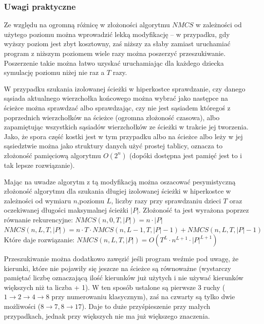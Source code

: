 \documentclass{pracamgr}
\begin{document}
    \subsubsection{Uwagi praktyczne}
     Ze względu na ogromną różnicę w złożoności algorytmu $NMCS$ w zależności od użytego poziomu można wprowadzić lekką modyfikację -- w przypadku,
     gdy wyższy poziom jest zbyt kosztowny, zaś niższy za słaby zamiast uruchamiać program z niższym poziomem wiele razy można poszerzyć przeszukiwanie.
     Poszerzenie takie można łatwo uzyskać uruchamiając dla każdego dziecka symulację poziomu niżej nie raz a $T$ razy.
     
     W przypadku szukania izolowanej ścieżki w hiperkostce sprawdzanie, czy danego sąsiada aktualnego wierzchołka końcowego można wybrać
     jako następce na ścieżce można sprawdzać albo sprawdzając, czy nie jest sąsiadem któregoś z poprzednich wierzchołków na ścieżce (ogromna złożoność czasowa),
     albo zapamiętując wszystkich sąsiadów wierzchołków ze ścieżki w trakcie jej tworzenia. Jako, że spora część kostki jest w tym przypadku albo na ścieżce
     albo leży w jej sąsiedztwie można jako struktury danych użyć prostej tablicy, oznacza to złożoność pamięciową algorytmu $O(2^n)$
     (dopóki dostępna jest pamięć jest to i tak lepsze rozwiązanie).
     
     Mając na uwadze algorytm z tą modyfikacją można oszacować pesymistyczną złożoność algorytmu dla szukania długiej izolowanej ścieżki w hiperkostce
     w zależności od wymiaru $n$,poziomu $L$, liczby razy przy sprawdzaniu dzieci $T$ oraz oczekiwanej długości maksymalnej ścieżki $|P|$.
     Złożoność ta jest wyrażona poprzez równanie rekurencyjne:\newline
     $NMCS(n,0,T,|P|)=n\cdot |P|$\newline
     $NMCS(n,L,T,|P|)=n\cdot T\cdot NMCS(n,L-1,T,|P|-1)+NMCS(n,L,T,|P|-1)$\newline
     Które daje rozwiązanie:\newline
     $NMCS(n,L,T,|P|)=O(T^L\cdot n^{L+1}\cdot|P|^{L+1})$
     
     Przeszukiwanie można dodatkowo zawęzić jeśli program weźmie pod uwagę, że kierunki, które nie pojawiły się jeszcze na ścieżce są równoważne
     (wystarczy pamiętać liczbę oznaczającą ilość kierunków już użytych i nie używać kierunków większych niż ta liczba + 1).
     W ten sposób ustalone są pierwsze 3 ruchy ($1\rightarrow2\rightarrow4\rightarrow8$ przy numerowaniu klasycznym),
     zaś na czwarty są tylko dwie możliwości ($8\rightarrow7,8\rightarrow17$). Daje to duże przyśpieszenie przy małych przypadkach,
     jednak przy większych nie ma już większego znaczenia.
\end{document}
